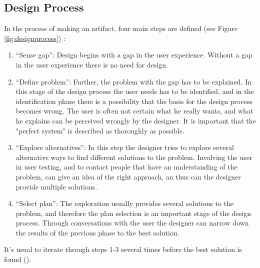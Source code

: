 \subsection{Design Process}
\label{sec:designprocess}
In the process of making an artifact, four main steps are defined (see Figure \ref{fig:designprocess}) :
\begin{enumerate}
 \item ``Sense gap'': Design begins with a gap in the user experience. Without a gap in the user experience there is no need for design.
 \item ``Define problem'': Further, the problem with the gap has to be explained. In this stage of the design process the user needs has to be identified, and in the identification phase there is a possibility that the basis for the design process becomes wrong. The user is often not certain what he really wants, and what he explains can be perceived wrongly by the designer. It is important that the "perfect system" is described as thoroughly as possible.
 \item ``Explore alternatives'': In this step the designer tries to explore several alternative ways to find  different solutions to the problem. Involving the user in user testing, and to contact people that have an understanding of the problem, can give an idea of the right approach, an thus can the designer provide multiple solutions.
     \item ``Select plan'': The exploration usually provides several solutions to the problem, and therefore the plan selection is an important stage of the design process. Through conversations with the user the designer can narrow down the results of the previous phase to the best solution.
 \end{enumerate}
 It's usual to iterate through steps 1-3 several times before the best solution is found (\cite{ulrich}).
 
